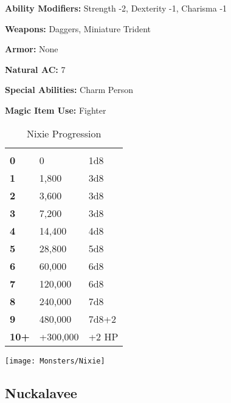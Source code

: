 \begin{multicols*}{2}
{\textbf{Ability Modifiers:} Strength -2, Dexterity -1, Charisma -1

\textbf{Weapons:} Daggers, Miniature Trident

\textbf{Armor:} None

\textbf{Natural AC:} 7

\textbf{Special Abilities:} Charm Person

\textbf{Magic Item Use:} Fighter}

\begin {table}[H]
  \caption{Nixie Progression}
  \begin{tabularx}{\columnwidth}{>{\bfseries}YYY}
   &  & \\
	0 & 0 & 1d8\\
	1 & 1,800 & 3d8\\
	2 & 3,600 & 3d8\\
	3 & 7,200 & 3d8\\
	4 & 14,400 & 4d8\\
	5 & 28,800 & 5d8\\
	6 & 60,000 & 6d8\\
	7 & 120,000 & 6d8\\
	8 & 240,000 & 7d8\\
	9 & 480,000 & 7d8+2\\
	10+ & +300,000 & +2 HP
  \end {tabularx}
\end {table}

\texttt{[image: Monsters/Nixie]}

\subsection{Nuckalavee}
\end{multicols*}
